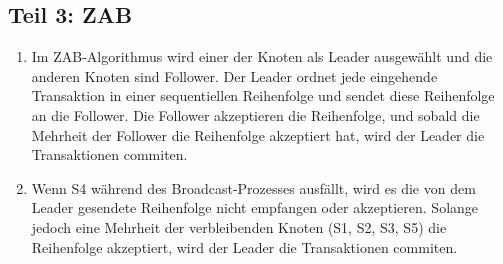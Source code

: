 \documentclass{article}
\begin{document}
\subsection*{Teil 3: ZAB}

\begin{enumerate}
\item Im ZAB-Algorithmus wird einer der Knoten als Leader ausgewählt und die anderen Knoten sind Follower. Der Leader ordnet jede eingehende Transaktion in einer sequentiellen Reihenfolge und sendet diese Reihenfolge an die Follower. Die Follower akzeptieren die Reihenfolge, und sobald die Mehrheit der Follower die Reihenfolge akzeptiert hat, wird der Leader die Transaktionen commiten.

\item Wenn S4 während des Broadcast-Prozesses ausfällt, wird es die von dem Leader gesendete Reihenfolge nicht empfangen oder akzeptieren. Solange jedoch eine Mehrheit der verbleibenden Knoten (S1, S2, S3, S5) die Reihenfolge akzeptiert, wird der Leader die Transaktionen commiten.
\end{enumerate}
\end{document}
